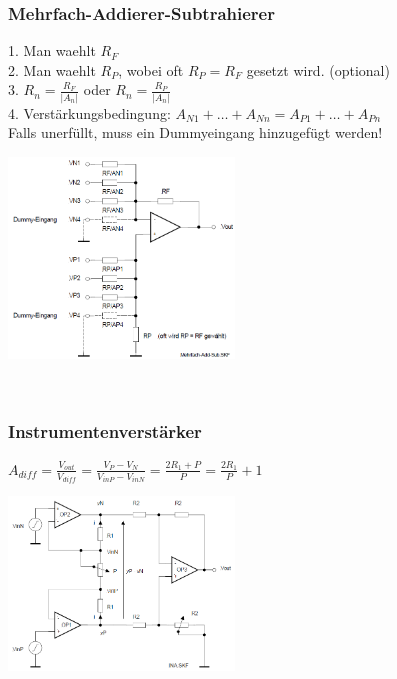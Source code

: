 		\subsubsection{Mehrfach-Addierer-Subtrahierer } 		
		\begin{minipage}[b]{12cm}
		1. Man waehlt $R_{F}$\\
		2. Man waehlt $R_{P}$, wobei oft $R_{P}=R_{F}$ gesetzt wird. (optional)\\
		3. $R_{n}=\frac{R_{F}}{\left|A_{n}\right|}$ oder
			$R_{n}=\frac{R_{P}}{\left|A_{n}\right|}$\\ 
		4. Verstärkungsbedingung: $A_{N1} +
		\ldots + A_{Nn} = A_{P1} + \ldots + A_{Pn}$ \\Falls unerfüllt, muss ein Dummyeingang hinzugefügt werden!
		\end{minipage}
		\begin{minipage}{6cm}
          	\includegraphics[width=6cm]{./bilder/mehrfach-addierer-subtrahierer.png} 
        \end{minipage}\\

		\subsubsection{Instrumentenverstärker }
		\begin{minipage}[b]{12cm}
		$A_{diff}=\frac{V_{out}}{V_{diff}}=\frac{V_{P}-V_{N}}{V_{inP}-V_{inN}}
		=\frac{2R_{1}+P}{P}=\frac{2R_{1}}{P}+1$\\
		\end{minipage}
		\begin{minipage}{6cm}
          	\includegraphics[width=6cm]{./bilder/Instrumentationsverstaerker.png} 
        \end{minipage}\\

